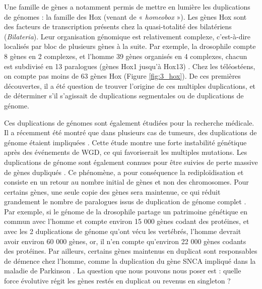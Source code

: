 \par Une famille de gènes a notamment permis de mettre en lumière les duplications de génomes : la famille des Hox (venant de « \textit{homeobox} »). Les gènes Hox sont des facteurs de transcription présents chez la quasi-totalité des bilatériens (\textit{Bilateria}). Leur organisation génomique est relativement complexe, c’est-à-dire localisés par bloc de plusieurs gènes à la suite. Par exemple, la drosophile compte 8 gènes en 2 complexes, et l’homme 39 gènes organisés en 4 complexes, chacun est subdivisé en 13 paralogues (gènes Hox1 jusqu’à Hox13) \parencite{hoegg_hox_2005, meyer_vertebrate_1999, rux_hox_2017}. Chez les téléostéens, on compte pas moins de 63 gènes Hox \parencite{meyer_vertebrate_1999, stellwag_hox_1999} (Figure \ref{fig:3_hox}). De ces premières découvertes, il a été question de trouver l’origine de ces multiples duplications, et de déterminer s’il s’agissait de duplications segmentales ou de duplications de génome. 
\par Ces duplications de génomes sont également étudiées pour la recherche médicale. Il a récemment été montré que dans plusieurs cas de tumeurs, des duplications de génome étaient impliquées \parencite{gemble_genetic_2022}. Cette étude montre une forte instabilité génétique après des événements de WGD, ce qui favoriserait les multiples mutations. 
Les duplications de génome sont également connues pour être suivies de perte massive de gènes dupliqués \parencite{inoue_rapid_2015, jaillon_genome_2004}. Ce phénomène, a pour conséquence la rediploïdisation et consiste en un retour au nombre initial de gènes et non des chromosomes. Pour certains gènes, une seule copie des gènes sera maintenue, ce qui réduit grandement le nombre de paralogues issus de duplication de génome complet \parencite{byrne_yeast_2005}. Par exemple, si le génome de la drosophile partage un patrimoine génétique en commun avec l’homme et compte environ 15 000 gènes codant des protéines, et avec les 2 duplications de génome qu’ont vécu les vertébrés, l’homme devrait avoir environ 60 000 gènes, or, il n’en compte qu’environ 22 000 gènes codants des protéines. Par ailleurs, certains gènes maintenus en duplicat sont responsables de démence chez l’homme, comme la duplication du gène SNCA impliqué dans la maladie de Parkinson \parencite{chartier-harlin_alpha-synuclein_2004, ibanez_causal_2004}. 
La question que nous pouvons nous poser est : quelle force évolutive régit les gènes restés en duplicat ou revenus en singleton ? 

